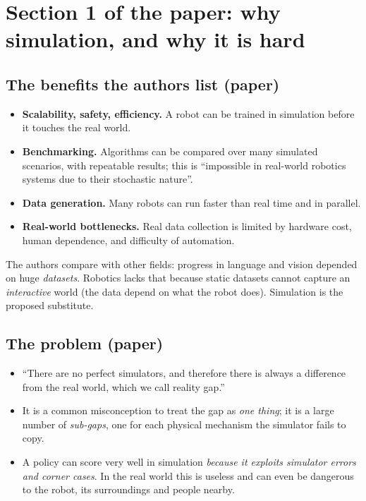 \documentclass[11pt,a4paper]{article}
\begin{document}
\section{Section 1 of the paper: why simulation, and why it is hard}

\subsection{The benefits the authors list \textnormal{\textbf{(paper)}}}
\begin{itemize}
\item \textbf{Scalability, safety, efficiency.} A robot can be trained in simulation before it
touches the real world.
\item \textbf{Benchmarking.} Algorithms can be compared over many simulated scenarios, with
repeatable results; this is ``impossible in real-world robotics systems due to their stochastic
nature''.
\item \textbf{Data generation.} Many robots can run faster than real time and in parallel.
\item \textbf{Real-world bottlenecks.} Real data collection is limited by hardware cost, human
dependence, and difficulty of automation.
\end{itemize}

The authors compare with other fields: progress in language and vision depended on huge
\emph{datasets}. Robotics lacks that because static datasets cannot capture an \emph{interactive}
world (the data depend on what the robot does). Simulation is the proposed substitute.

\subsection{The problem \textnormal{\textbf{(paper)}}}
\begin{itemize}
\item ``There are no perfect simulators, and therefore there is always a difference from the
real world, which we call reality gap.''
\item It is a common misconception to treat the gap as \emph{one thing}; it is a large number
of \emph{sub-gaps}, one for each physical mechanism the simulator fails to copy.
\item A policy can score very well in simulation \emph{because it exploits simulator errors and
corner cases}. In the real world this is useless and can even be dangerous to the robot, its
surroundings and people nearby.
\end{itemize}
\end{document}
